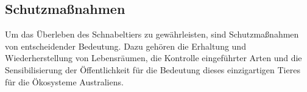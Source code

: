     \subsection{Schutzmaßnahmen}
    Um das Überleben des Schnabeltiers zu gewährleisten, sind Schutzmaßnahmen von entscheidender Bedeutung. Dazu gehören die Erhaltung und Wiederherstellung von Lebensräumen, die Kontrolle eingeführter Arten und die Sensibilisierung der Öffentlichkeit für die Bedeutung dieses einzigartigen Tieres für die Ökosysteme Australiens.
